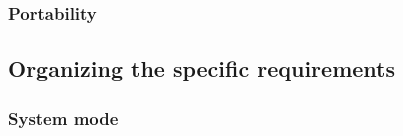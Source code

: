 
\subsubsection{Portability}


\subsection{Organizing the specific requirements}


\subsubsection{System mode}


